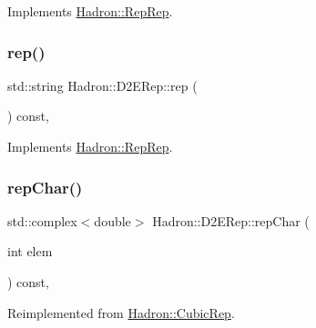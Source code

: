 Implements \mbox{\hyperlink{structHadron_1_1RepRep_ab3213025f6de249f7095892109575fde}{Hadron\+::\+Rep\+Rep}}.

\mbox{\label{structHadron_1_1D2ERep_a5fbd82820d3cde321d9208b7208873fb}} 
\subsubsection{\texorpdfstring{rep()}{rep()}\hspace{0.1cm}{\footnotesize\ttfamily [3/3]}}
{\footnotesize\ttfamily std\+::string Hadron\+::\+D2\+E\+Rep\+::rep (\begin{DoxyParamCaption}{ }\end{DoxyParamCaption}) const\hspace{0.3cm}{\ttfamily [inline]}, {\ttfamily [virtual]}}



Implements \mbox{\hyperlink{structHadron_1_1RepRep_ab3213025f6de249f7095892109575fde}{Hadron\+::\+Rep\+Rep}}.

\mbox{\label{structHadron_1_1D2ERep_a0507e2c08a6c305e5f0fc4f36a92f0be}} 
\subsubsection{\texorpdfstring{repChar()}{repChar()}\hspace{0.1cm}{\footnotesize\ttfamily [1/2]}}
{\footnotesize\ttfamily std\+::complex$<$double$>$ Hadron\+::\+D2\+E\+Rep\+::rep\+Char (\begin{DoxyParamCaption}\item[{int}]{elem }\end{DoxyParamCaption}) const\hspace{0.3cm}{\ttfamily [inline]}, {\ttfamily [virtual]}}



Reimplemented from \mbox{\hyperlink{structHadron_1_1CubicRep_af45227106e8e715e84b0af69cd3b36f8}{Hadron\+::\+Cubic\+Rep}}.

